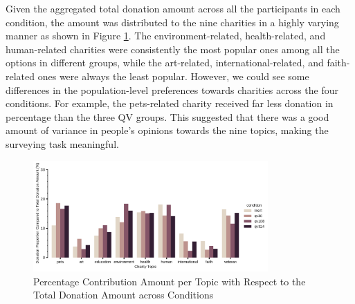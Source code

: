 Given the aggregated total donation amount across all the participants in each condition, the amount was distributed to the nine charities in a highly varying manner as shown in Figure \ref{fig:topic_don_exp1}. The environment-related, health-related, and human-related charities were consistently the most popular ones among all the options in different groups, while the art-related, international-related, and faith-related ones were always the least popular. However, we could see some differences in the population-level preferences towards charities across the four conditions. For example, the pets-related charity received far less donation in percentage than the three QV groups. This suggested that there was a good amount of variance in people's opinions towards the nine topics, making the surveying task meaningful.

\begin{figure}[htpb]
    \centering
    \includegraphics[width=0.8\textwidth, keepaspectratio=true]{content/image/normalized_contributions_per_topic_across_conditions.pdf}
    \caption{
      Percentage Contribution Amount per Topic with Respect to the Total Donation Amount across Conditions
    }
    \label{fig:topic_don_exp1}
\end{figure}



    
    

